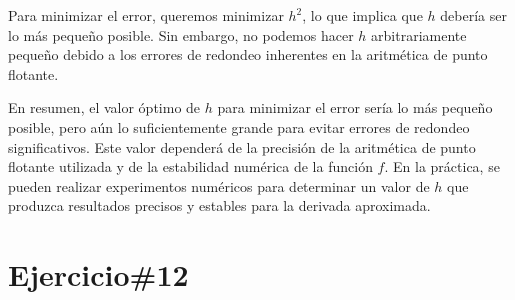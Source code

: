 \documentclass[a4paper,12pt]{article}
\begin{document}
Para minimizar el error, queremos minimizar \( h^2 \), lo que implica que \( h \) debería ser lo más pequeño posible. Sin embargo, no podemos hacer \( h \) arbitrariamente pequeño debido a los errores de redondeo inherentes en la aritmética de punto flotante.

En resumen, el valor óptimo de \( h \) para minimizar el error sería lo más pequeño posible, pero aún lo suficientemente grande para evitar errores de redondeo significativos. Este valor dependerá de la precisión de la aritmética de punto flotante utilizada y de la estabilidad numérica de la función \( f \). En la práctica, se pueden realizar experimentos numéricos para determinar un valor de \( h \) que produzca resultados precisos y estables para la derivada aproximada.


\section*{Ejercicio\#12}


\end{document}
